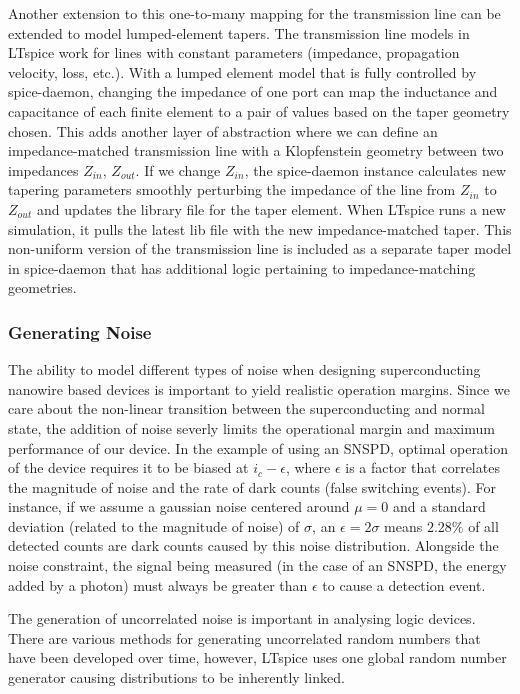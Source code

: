 \documentclass{article}
\newcommand{\todofig}[2][]{\todo[color=red!40, #1]{\textbf{add fig:}\\#2}}
\newcommand{\todoidea}[2][]{\todo[color=green!40, #1]{\textbf{idea:}\\#2}}
\begin{document}
Another extension to this one-to-many mapping for the transmission line can be extended to model
lumped-element tapers. The transmission line models in LTspice work for lines with constant 
parameters (impedance, propagation velocity, loss, etc.). With a lumped element model that is fully
controlled by spice-daemon, changing the impedance of one port can map the inductance and capacitance
of each finite element to a pair of values based on the taper geometry chosen. This adds another layer
of abstraction where we can define an impedance-matched transmission line with a Klopfenstein geometry
between two impedances $Z_{in},\, Z_{out}$. If we change $Z_{in}$, the spice-daemon instance calculates
new tapering parameters smoothly perturbing the impedance of the line from $Z_{in}$ to $Z_{out}$ and
updates the library file for the taper element. When LTspice runs a new simulation, it pulls the latest
lib file with the new impedance-matched taper. This non-uniform version of the transmission line
is included as a separate taper model in spice-daemon that has additional logic pertaining to 
impedance-matching geometries.

\todoidea[inline]{PNR!}

\todofig[]{pnr}

\subsubsection{Generating Noise}

The ability to model different types of noise when designing superconducting nanowire based devices
is important to yield realistic operation margins. Since we care about the non-linear transition between
the superconducting and normal state, the addition of noise severly limits the operational margin and
maximum performance of our device. In the example of using an SNSPD, optimal operation of the device 
requires it to be biased at $i_c-\epsilon$, where $\epsilon$ is a factor that correlates the 
magnitude of noise and the rate of dark counts (false switching events). For instance, if we assume a 
gaussian noise centered around $\mu=0$ and a standard deviation (related to the magnitude of noise) of $\sigma$,
an $\epsilon = 2\sigma$ means $2.28\%$ of all detected counts are dark counts caused by this noise distribution.
Alongside the noise constraint, the signal being measured (in the case of an SNSPD, the energy added by a photon)
must always be greater than $\epsilon$ to cause a detection event.

The generation of uncorrelated noise is important in analysing logic devices. 
There are various methods for generating uncorrelated random numbers that have been developed over time, 
however, LTspice uses one global random number generator causing distributions to be inherently linked.
\end{document}
